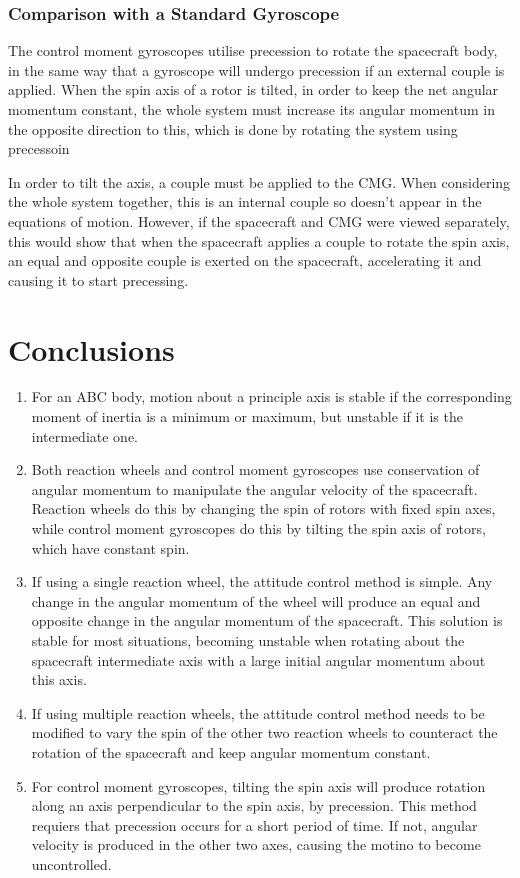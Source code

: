\documentclass[12]{article}
\begin{document}
\begin{multicols*}{2}
\subsubsection{Comparison with a Standard Gyroscope}

The control moment gyroscopes utilise precession to rotate the spacecraft body, in the same way that a gyroscope will undergo precession if an external couple is applied. When the spin axis of a rotor is tilted, in order to keep the net angular momentum constant, the whole system must increase its angular momentum in the opposite direction to this, which is done by rotating the system using precessoin

In order to tilt the axis, a couple must be applied to the CMG. When considering the whole system together, this is an internal couple so doesn't appear in the equations of motion. However, if the spacecraft and CMG were viewed separately, this would show that when the spacecraft applies a couple to rotate the spin axis, an equal and opposite couple is exerted on the spacecraft, accelerating it and causing it to start precessing.

\section{Conclusions}

\begin{enumerate}
\item For an ABC body, motion about a principle axis is stable if the corresponding moment of inertia is a minimum or maximum, but unstable if it is the intermediate one.
\item Both reaction wheels and control moment gyroscopes use conservation of angular momentum to manipulate the angular velocity of the spacecraft. Reaction wheels do this by changing the spin of rotors with fixed spin axes, while control moment gyroscopes do this by tilting the spin axis of rotors, which have  constant spin.
\item If using a single reaction wheel, the attitude control method is simple. Any change in the angular momentum of the wheel will produce an equal and opposite change in the angular momentum of the spacecraft. This solution is stable for most situations, becoming unstable when rotating about the spacecraft intermediate axis with a large initial angular momentum about this axis.
\item If using multiple reaction wheels, the attitude control method needs to be modified to vary the spin of the other two reaction wheels to counteract the rotation of the spacecraft and keep angular momentum constant.
\item For control moment gyroscopes, tilting the spin axis will produce rotation along an axis perpendicular to the spin axis, by precession. This method requiers that precession occurs for a short period of time. If not, angular velocity is produced in the other two axes, causing the motino to become uncontrolled.
\end{enumerate}


\end{multicols*}
\end{document}
